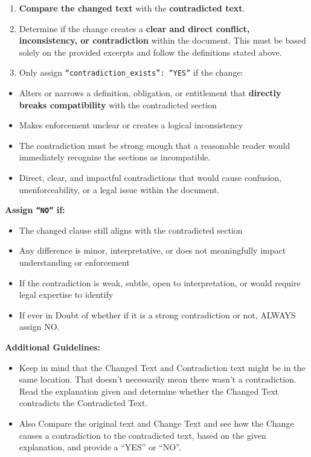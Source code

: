 \documentclass[11pt]{article}
\begin{document}
\begin{tcolorbox}[breakable,colback=lightestgray,colframe=black,title=\textbf{In-Text LLM Validation Prompt}]
\begin{enumerate}
    \item \textbf{Compare the changed text} with the \textbf{contradicted text}.
    \item Determine if the change creates a \textbf{clear and direct conflict, inconsistency, or contradiction} within the document. This must be based solely on the provided excerpts and follow the definitions stated above.
    \item Only assign \texttt{``contradiction\_exists'': ``YES''} if the change:
\end{enumerate}
\begin{itemize}
    \item Alters or narrows a definition, obligation, or entitlement that \textbf{directly breaks compatibility} with the contradicted section
    \item Makes enforcement unclear or creates a logical inconsistency
    \item The contradiction must be strong enough that a reasonable reader would immediately recognize the sections as incompatible.
    \item Direct, clear, and impactful contradictions that would cause confusion, unenforceability, or a legal issue within the document.
\end{itemize}

\textbf{Assign \texttt{``NO''} if:}
\begin{itemize}
    \item The changed clause still aligns with the contradicted section
    \item Any difference is minor, interpretative, or does not meaningfully impact understanding or enforcement
    \item If the contradiction is weak, subtle, open to interpretation, or would require legal expertise to identify
    \item If ever in Doubt of whether if it is a strong contradiction or not, ALWAYS assign NO.
\end{itemize}

\textbf{Additional Guidelines:}
\begin{itemize}
    \item Keep in mind that the Changed Text and Contradiction text might be in the same location. That doesn't necessarily mean there wasn't a contradiction. Read the explanation given and determine whether the Changed Text contradicts the Contradicted Text.
    \item Also Compare the original text and Change Text and see how the Change causes a contradiction to the contradicted text, based on the given explanation, and provide a ``YES'' or ``NO''.
\end{itemize}


\end{tcolorbox}
\end{document}
